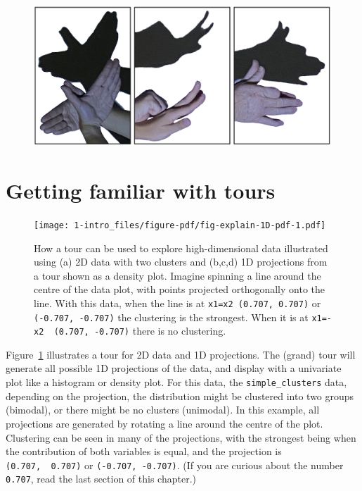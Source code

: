 \documentclass[
  letterpaper,
]{krantz}
\begin{document}
\begin{figure}

{\centering \includegraphics[width=4.6875in,height=\textheight]{images/shadow_puppets.png}

}

\end{figure}

\hypertarget{getting-familiar-with-tours}{%
\section{Getting familiar with
tours}\label{getting-familiar-with-tours}}

\begin{figure}

{\centering \texttt{[image: 1-intro\_files/figure-pdf/fig-explain-1D-pdf-1.pdf]}

}

\caption{\label{fig-explain-1D-pdf}How a tour can be used to explore
high-dimensional data illustrated using (a) 2D data with two clusters
and (b,c,d) 1D projections from a tour shown as a density plot. Imagine
spinning a line around the centre of the data plot, with points
projected orthogonally onto the line. With this data, when the line is
at \texttt{x1=x2\ (0.707,\ 0.707)} or \texttt{(-0.707,\ -0.707)} the
clustering is the strongest. When it is at
\texttt{x1=-x2\ \ (0.707,\ -0.707)} there is no clustering.}

\end{figure}

Figure~\ref{fig-explain-1D-pdf} illustrates a tour for 2D data and 1D
projections. The (grand) tour will generate all possible 1D projections
of the data, and display with a univariate plot like a histogram or
density plot. For this data, the \texttt{simple\_clusters} data,
depending on the projection, the distribution might be clustered into
two groups (bimodal), or there might be no clusters (unimodal). In this
example, all projections are generated by rotating a line around the
centre of the plot. Clustering can be seen in many of the projections,
with the strongest being when the contribution of both variables is
equal, and the projection is \texttt{(0.707,\ \ 0.707)} or
\texttt{(-0.707,\ -0.707)}. (If you are curious about the number
\texttt{0.707}, read the last section of this chapter.)
\end{document}
